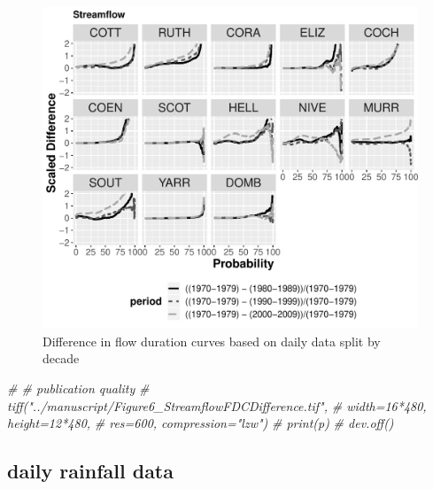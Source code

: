 \documentclass[]{article}
\newenvironment{Shaded}{\begin{snugshade}}{\end{snugshade}}
\newcommand{\CommentTok}[1]{\textcolor[rgb]{0.56,0.35,0.01}{\textit{{#1}}}}
\begin{document}
\begin{figure}[htbp]
\centering
\includegraphics{4.FDC_Analysis_files/figure-latex/FDC_flow-1.pdf}
\caption{Difference in flow duration curves based on daily data split by
decade}
\end{figure}

\begin{Shaded}
\begin{Highlighting}[]
\CommentTok{# # publication quality}
\CommentTok{# tiff("../manuscript/Figure6_StreamflowFDCDifference.tif",}
\CommentTok{#      width=16*480, height=12*480,}
\CommentTok{#      res=600, compression="lzw")}
\CommentTok{# print(p)}
\CommentTok{# dev.off()}
\end{Highlighting}
\end{Shaded}

\subsection{daily rainfall data}\label{daily-rainfall-data}
\end{document}
